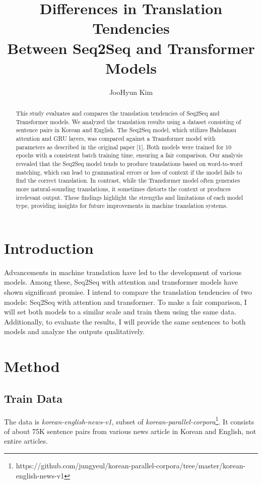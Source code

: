\documentclass{article}
\title{Differences in Translation Tendencies \\ Between Seq2Seq and Transformer Models}
\author{%
  JooHyun Kim
}
\begin{document}
\maketitle

\begin{abstract}
  This study evaluates and compares the translation tendencies of Seq2Seq and Transformer models. We analyzed the translation results using a dataset consisting of sentence pairs in Korean and English. The Seq2Seq model, which utilizes Bahdanau attention and GRU layers, was compared against a Transformer model with parameters as described in the original paper [1]. Both models were trained for 10 epochs with a consistent batch training time, ensuring a fair comparison. Our analysis revealed that the Seq2Seq model tends to produce translations based on word-to-word matching, which can lead to grammatical errors or loss of context if the model fails to find the correct translation. In contrast, while the Transformer model often generates more natural-sounding translations, it sometimes distorts the context or produces irrelevant output. These findings highlight the strengths and limitations of each model type, providing insights for future improvements in machine translation systems.

\end{abstract}

\section{Introduction}
Advancements in machine translation have led to the development of various models. Among these, Seq2Seq with attention and transformer models have shown significant promise. I intend to compare the translation tendencies of two models: Seq2Seq with attention and transformer. To make a fair comparison, I will set both models to a similar scale and train them using the same data. Additionally, to evaluate the results, I will provide the same sentences to both models and analyze the outputs qualitatively.

\section{Method}

\subsection{Train Data}
The data is \emph{korean-english-news-v1}, subset of \emph{korean-parallel-corpora}\footnote{https://github.com/jungyeul/korean-parallel-corpora/tree/master/korean-english-news-v1}. 
 It consists of about 75K sentence pairs from various news article in Korean and English, not entire articles. 
\end{document}
